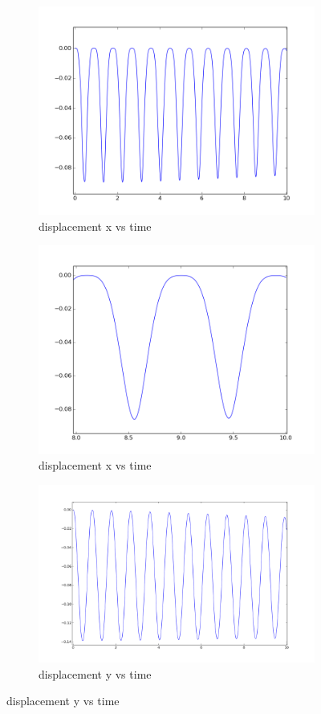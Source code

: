 \begin{figure}[!ht]
\begin{subfigure}[b]{0.5\linewidth}
\includegraphics[width=\linewidth]{figures/CSM3/CSM3_Full_x}\caption{displacement x vs time}
\end{subfigure}
\begin{subfigure}[b]{0.5\linewidth}
\includegraphics[width=\linewidth]{figures/CSM3/CSM3_2_x}\caption{displacement x vs time}
\end{subfigure}
\begin{subfigure}[b]{0.5\linewidth}
\includegraphics[width=\linewidth]{figures/CSM3/CSM3_Y_full}\caption{displacement y vs time}

\end{subfigure}
\end{figure}
